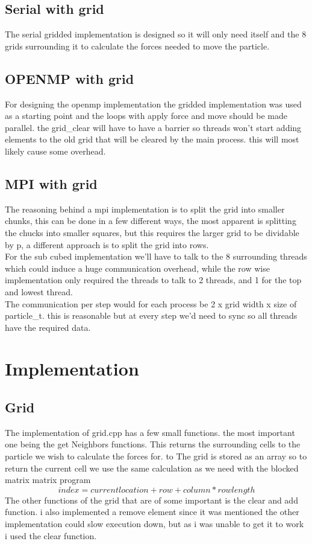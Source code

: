 \documentclass[a4paper,10pt,titlepage]{report}
\begin{document}
\subsection{Serial with grid}
The serial gridded implementation is designed so it will only need itself and the 8 grids surrounding it to calculate the forces needed to move the particle.

\subsection{OPENMP with grid}
For designing the openmp implementation the gridded implementation was used as a starting point and the loops with apply force and move should be made parallel. the grid\_clear will have to have a barrier so threads won't start adding elements to the old grid that will be cleared by the main process. this will most likely cause some overhead.

\subsection{MPI with grid}

The reasoning behind a mpi implementation is to split the grid into smaller chunks, this can be done in a few different ways, the most apparent is splitting the chucks into smaller squares, but this requires the larger grid to be dividable by p, a different approach is to split the grid into rows. \\
For the sub cubed implementation we'll have to talk to the 8 surrounding threads which could induce a huge communication overhead, while the row wise implementation only required the threads to talk to 2 threads, and 1 for the top and lowest thread. \\

The communication per step would for each process be 2 x grid width x size of particle\_t. this is reasonable but at every step we'd need to sync so all threads have the required data. \\

\newpage

\section{Implementation}
\subsection{Grid}
The implementation of grid.cpp has a few small functions. the most important one being the get Neighbors functions. This returns the surrounding cells to the particle we wish to calculate the forces for. to The grid is stored as an array so to return the current cell we use the same calculation as we need with the blocked matrix matrix program
\begin{equation}
index = current location + row + column * row length
\end{equation}
The other functions of the grid that are of some important is the clear and add function. i also implemented a remove element since it was mentioned the other implementation could slow execution down, but as i was unable to get it to work i used the clear function.
\end{document}
